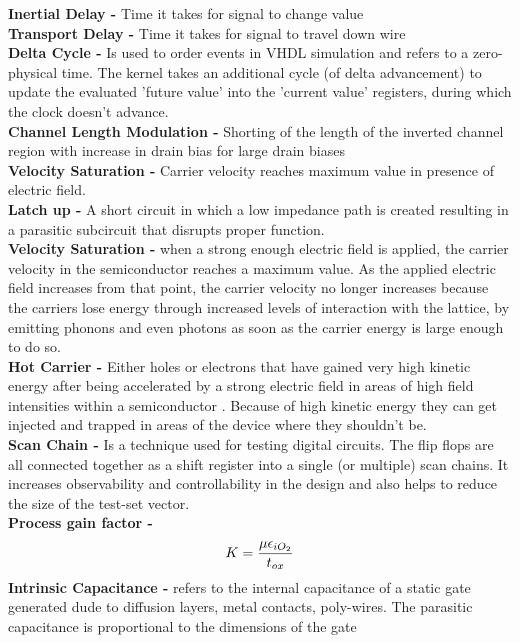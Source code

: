 \documentclass[9pt,fleqn]{article}
\begin{document}
\begin{multicols}{3}
    \newpage
    \textbf{Inertial Delay -} Time it takes for signal to change value \\
    \textbf{Transport Delay -} Time it takes for signal to travel down wire \\
    \textbf{Delta Cycle -} Is used to order events in VHDL simulation and
    refers to a zero-physical time. The kernel takes an additional cycle (of
    delta advancement) to update the evaluated 'future value' into the 'current
    value' registers, during which the clock doesn't advance. \\
    \textbf{Channel Length Modulation -} Shorting of the length of the inverted
    channel region with increase in drain bias for large drain biases \\
    \textbf{Velocity Saturation -} Carrier velocity reaches maximum value in
    presence of electric field. \\
    \textbf{Latch up -} A short circuit in which a low impedance path is
    created resulting in a parasitic subcircuit that disrupts proper function.\\
    \textbf{Velocity Saturation -} when a strong enough electric field is
    applied, the carrier velocity in the semiconductor reaches a maximum value.
    As the applied electric field increases from that point, the carrier
    velocity no longer increases because the carriers lose energy through
    increased levels of interaction with the lattice, by emitting phonons and
    even photons as soon as the carrier energy is large enough to do so.\\
    \textbf{Hot Carrier -} Either holes or electrons  that have gained very
    high kinetic energy after being accelerated by a strong electric field in
    areas of high field intensities within a semiconductor .  Because of high
    kinetic energy they can get injected and trapped in areas of the device
    where they shouldn't be.\\
    \textbf{Scan Chain -} Is a technique used for testing digital circuits. The
    flip flops are all connected together as a shift register into a single (or
    multiple) scan chains. It increases observability and controllability in
    the design and also helps to reduce the size of the test-set vector. \\
    \textbf{Process gain factor -} $$ K = {\mu \epsilon_{iO_{2}} \over t_{ox}} $$
    \textbf{Intrinsic Capacitance -} refers to the internal capacitance of a
    static gate generated dude to diffusion layers, metal contacts, poly-wires.
    The parasitic capacitance is proportional to the dimensions of the gate

\end{multicols}
\end{document}
